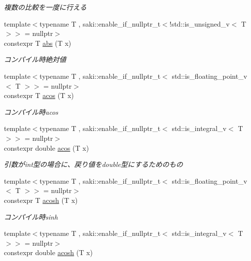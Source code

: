 \begin{DoxyCompactItemize}
\begin{DoxyCompactList}\small\item\em 複数の比較を一度に行える \end{DoxyCompactList}\item 
{\footnotesize template$<$typename T , saki\+::enable\+\_\+if\+\_\+nullptr\+\_\+t$<$!std\+::is\+\_\+unsigned\+\_\+v$<$ T $>$$>$  = nullptr$>$ }\\constexpr T \mbox{\hyperlink{namespacesaki_a37cd607ad87b208aa6105b5d8287dc9e}{abs}} (T x)
\begin{DoxyCompactList}\small\item\em コンパイル時絶対値 \end{DoxyCompactList}\item 
{\footnotesize template$<$typename T , saki\+::enable\+\_\+if\+\_\+nullptr\+\_\+t$<$ std\+::is\+\_\+floating\+\_\+point\+\_\+v$<$ T $>$$>$  = nullptr$>$ }\\constexpr T \mbox{\hyperlink{namespacesaki_a3189b75c5c7ecbf6d2204142da5fa813}{acos}} (T x)
\begin{DoxyCompactList}\small\item\em コンパイル時acos \end{DoxyCompactList}\item 
{\footnotesize template$<$typename T , saki\+::enable\+\_\+if\+\_\+nullptr\+\_\+t$<$ std\+::is\+\_\+integral\+\_\+v$<$ T $>$$>$  = nullptr$>$ }\\constexpr double \mbox{\hyperlink{namespacesaki_a2cad65bf92f361b4b564268af96a7844}{acos}} (T x)
\begin{DoxyCompactList}\small\item\em 引数がint型の場合に、戻り値をdouble型にするためのもの \end{DoxyCompactList}\item 
{\footnotesize template$<$typename T , saki\+::enable\+\_\+if\+\_\+nullptr\+\_\+t$<$ std\+::is\+\_\+floating\+\_\+point\+\_\+v$<$ T $>$$>$  = nullptr$>$ }\\constexpr T \mbox{\hyperlink{namespacesaki_ac1c85a4defc25dc9eb6b380f29946f83}{acosh}} (T x)
\begin{DoxyCompactList}\small\item\em コンパイル時sinh \end{DoxyCompactList}\item 
{\footnotesize template$<$typename T , saki\+::enable\+\_\+if\+\_\+nullptr\+\_\+t$<$ std\+::is\+\_\+integral\+\_\+v$<$ T $>$$>$  = nullptr$>$ }\\constexpr double \mbox{\hyperlink{namespacesaki_a8d3766d425082661e966b04504b90002}{acosh}} (T x)

\end{DoxyCompactItemize}
